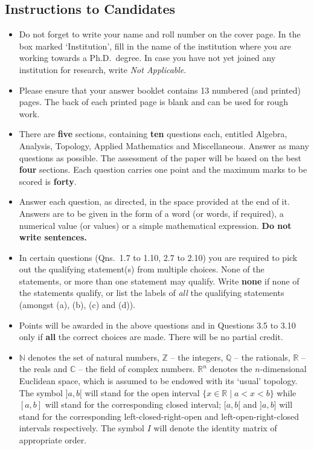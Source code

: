 \documentclass[11pt,a4paper]{article}
\newcommand{\N}{\mathbb{N}}
\newcommand{\Z}{\mathbb{Z}}
\newcommand{\Q}{\mathbb{Q}}
\newcommand{\R}{\mathbb{R}}
\newcommand{\C}{\mathbb{C}}
\begin{document}
\subsection*{Instructions to Candidates}
\begin{itemize}
  \item Do not forget to write your name and roll number on the cover page. In the box marked `Institution', fill in the name of the institution where you are working towards a Ph.D.\ degree. In case you have not yet joined any institution for research, write \emph{Not Applicable}.
  \item Please ensure that your answer booklet contains 13 numbered (and printed) pages. The back of each printed page is blank and can be used for rough work.
  \item There are \textbf{five} sections, containing \textbf{ten} questions each, entitled Algebra, Analysis, Topology, Applied Mathematics and Miscellaneous. Answer as many questions as possible. The assessment of the paper will be based on the best \textbf{four} sections. Each question carries one point and the maximum marks to be scored is \textbf{forty}.
  \item Answer each question, as directed, in the space provided at the end of it. Answers are to be given in the form of a word (or words, if required), a numerical value (or values) or a simple mathematical expression. \textbf{Do not write sentences.}
  \item In certain questions (Qns.\ 1.7 to 1.10, 2.7 to 2.10) you are required to pick out the qualifying statement(s) from multiple choices. None of the statements, or more than one statement may qualify. Write \textbf{none} if none of the statements qualify, or list the labels of \emph{all} the qualifying statements (amongst (a), (b), (c) and (d)).
  \item Points will be awarded in the above questions and in Questions 3.5 to 3.10 only if \textbf{all} the correct choices are made. There will be no partial credit.
  \item $\N$ denotes the set of natural numbers, $\Z$ -- the integers, $\Q$ -- the rationals, $\R$ -- the reals and $\C$ -- the field of complex numbers. $\R^n$ denotes the $n$-dimensional Euclidean space, which is assumed to be endowed with its `usual' topology. The symbol $]a, b[$ will stand for the open interval $\{x \in \R \mid a < x < b\}$ while $[a, b]$ will stand for the corresponding closed interval; $[a, b[$ and $]a, b]$ will stand for the corresponding left-closed-right-open and left-open-right-closed intervals respectively. The symbol $I$ will denote the identity matrix of appropriate order.
\end{itemize}
\end{document}
